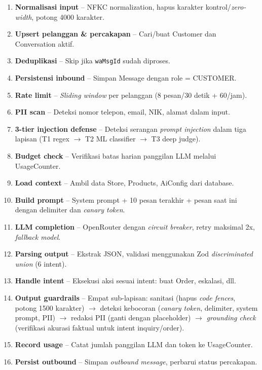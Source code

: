 \documentclass[12pt,a4paper,oneside]{article}
\begin{document}
\begin{enumerate}[nosep, leftmargin=*]
	\item \textbf{Normalisasi input} -- NFKC normalization, hapus karakter kontrol/\textit{zero-width}, potong 4000 karakter.
	\item \textbf{Upsert pelanggan \& percakapan} -- Cari/buat Customer dan Conversation aktif.
	\item \textbf{Deduplikasi} -- Skip jika \texttt{waMsgId} sudah diproses.
	\item \textbf{Persistensi inbound} -- Simpan Message dengan role = CUSTOMER.
	\item \textbf{Rate limit} -- \textit{Sliding window} per pelanggan (8 pesan/30 detik + 60/jam).
	\item \textbf{PII scan} -- Deteksi nomor telepon, email, NIK, alamat dalam input.
	\item \textbf{3-tier injection defense} -- Deteksi serangan \textit{prompt injection} dalam tiga lapisan (T1 regex $\rightarrow$ T2 ML classifier $\rightarrow$ T3 deep judge).
	\item \textbf{Budget check} -- Verifikasi batas harian panggilan LLM melalui UsageCounter.
	\item \textbf{Load context} -- Ambil data Store, Products, AiConfig dari database.
	\item \textbf{Build prompt} -- System prompt + 10 pesan terakhir + pesan saat ini dengan delimiter dan \textit{canary token}.
	\item \textbf{LLM completion} -- OpenRouter dengan \textit{circuit breaker}, retry maksimal 2x, \textit{fallback model}.
	\item \textbf{Parsing output} -- Ekstrak JSON, validasi menggunakan Zod \textit{discriminated union} (6 intent).
	\item \textbf{Handle intent} -- Eksekusi aksi sesuai intent: buat Order, eskalasi, dll.
	\item \textbf{Output guardrails} -- Empat sub-lapisan: sanitasi (hapus \textit{code fences}, potong 1500 karakter) $\rightarrow$ deteksi kebocoran (\textit{canary token}, delimiter, system prompt, PII) $\rightarrow$ redaksi PII (ganti dengan placeholder) $\rightarrow$ \textit{grounding check} (verifikasi akurasi faktual untuk intent inquiry/order).
	\item \textbf{Record usage} -- Catat jumlah panggilan LLM dan token ke UsageCounter.
	\item \textbf{Persist outbound} -- Simpan \textit{outbound message}, perbarui status percakapan.
\end{enumerate}
\end{document}
